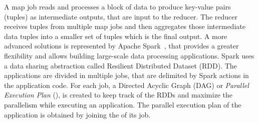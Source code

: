 A map job reads and processes a block of data to produce key-value pairs (tuples) as intermediate outputs, that are input to the reducer. The reducer receives tuples from multiple map jobs and then aggregates those intermediate data tuples into a smaller set of tuples which is the final output.
A more advanced solutions is represented by Apache Spark~\cite{misc:ApacheSpark}, that provides a greater flexibility and allows building large-scale data processing applications.
Spark uses a data sharing abstraction called Resilient Distributed Dataset (RDD). 
The applications are divided in multiple jobs, that are delimited by Spark actions in the application code. For each job, a Directed Acyclic Graph (DAG) or \textit{Parallel Execution Plan} (\plan), is created to keep track of the RDDs and maximize the parallelism while executing an application. 
The parallel execution plan of the application is obtained by joining the \plans of its job.
